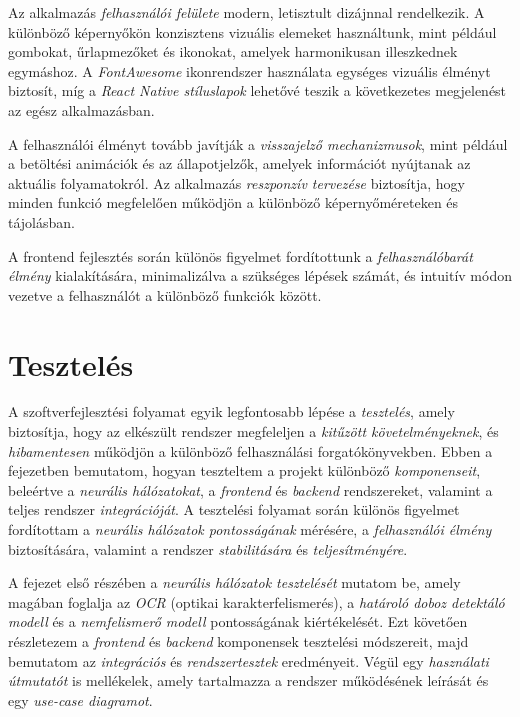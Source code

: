 \documentclass[
]{thesis-ekf}
\theoremstyle{definition}
\theoremstyle{remark}
\begin{document}
Az alkalmazás \emph{felhasználói felülete} modern, letisztult dizájnnal rendelkezik. A különböző képernyőkön konzisztens vizuális elemeket használtunk, mint például gombokat, űrlapmezőket és ikonokat, amelyek harmonikusan illeszkednek egymáshoz. A \emph{FontAwesome} ikonrendszer használata egységes vizuális élményt biztosít, míg a \emph{React Native stíluslapok} lehetővé teszik a következetes megjelenést az egész alkalmazásban.

A felhasználói élményt tovább javítják a \emph{visszajelző mechanizmusok}, mint például a betöltési animációk és az állapotjelzők, amelyek információt nyújtanak az aktuális folyamatokról. Az alkalmazás \emph{reszponzív tervezése} biztosítja, hogy minden funkció megfelelően működjön a különböző képernyőméreteken és tájolásban.

A frontend fejlesztés során különös figyelmet fordítottunk a \emph{felhasználóbarát élmény} kialakítására, minimalizálva a szükséges lépések számát, és intuitív módon vezetve a felhasználót a különböző funkciók között.
\chapter{Tesztelés}

A szoftverfejlesztési folyamat egyik legfontosabb lépése a \emph{tesztelés}, amely biztosítja, hogy az elkészült rendszer megfeleljen a \emph{kitűzött követelményeknek}, és \emph{hibamentesen} működjön a különböző felhasználási forgatókönyvekben. Ebben a fejezetben bemutatom, hogyan teszteltem a projekt különböző \emph{komponenseit}, beleértve a \emph{neurális hálózatokat}, a \emph{frontend} és \emph{backend} rendszereket, valamint a teljes rendszer \emph{integrációját}. A tesztelési folyamat során különös figyelmet fordítottam a \emph{neurális hálózatok pontosságának} mérésére, a \emph{felhasználói élmény} biztosítására, valamint a rendszer \emph{stabilitására} és \emph{teljesítményére}.

A fejezet első részében a \emph{neurális hálózatok tesztelését} mutatom be, amely magában foglalja az \emph{OCR} (optikai karakterfelismerés), a \emph{határoló doboz detektáló modell} és a \emph{nemfelismerő modell} pontosságának kiértékelését. Ezt követően részletezem a \emph{frontend} és \emph{backend} komponensek tesztelési módszereit, majd bemutatom az \emph{integrációs} és \emph{rendszertesztek} eredményeit. Végül egy \emph{használati útmutatót} is mellékelek, amely tartalmazza a rendszer működésének leírását és egy \emph{use-case diagramot}.
\end{document}
